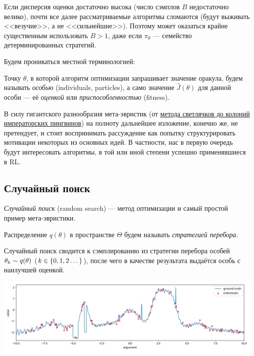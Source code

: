 \begin{remark}
Если дисперсия оценки достаточно высока (число сэмплов $B$ недостаточно велико), почти все далее рассматриваемые алгоритмы сломаются (будут выживать <<везучие>>, а не <<сильнейшие>>). Поэтому может оказаться крайне существенным использовать $B > 1$, даже если $\pi_\theta$ --- семейство детерминированных стратегий.
\end{remark}

Будем проникаться местной терминологией:
\begin{definition}
Точку $\theta$, в которой алгоритм оптимизации запрашивает значение оракула, будем называть \emph{особью} (individuals, particles), а само значение $\hat{J}(\theta)$ для данной особи --- её \emph{оценкой} или \emph{приспособленностью} (fitness).
\end{definition}

В силу гигантского разнообразия мета-эвристик (от \href{https://en.wikipedia.org/wiki/List_of_metaphor-based_metaheuristics}{метода светлячков до колоний императорских пингвинов}) на полноту дальнейшее изложение, конечно же, не претендует, и стоит воспринимать рассуждение как попытку структурировать мотивации некоторых из основных идей. В частности, нас в первую очередь будут интересовать алгоритмы, в той или иной степени успешно применявшиеся в RL.

\subsection{Случайный поиск}

\emph{Случайный поиск} (random search) --- метод оптимизации и самый простой пример мета-эвристики.

\begin{definition}
Распределение $q(\theta)$ в пространстве $\Theta$ будем называть \emph{стратегией перебора}.
\end{definition}

Случайный поиск сводится к сэмплированию из стратегии перебора особей $\theta_k \HM\sim q(\theta)$ ($k \HM\in \{0, 1, 2 \dots \}$), после чего в качестве результата выдаётся особь с наилучшей оценкой.

\begin{example}
\begin{center}
    \includegraphics[width=\textwidth]{Images/randomsearch.png}
\end{center}
\end{example}

